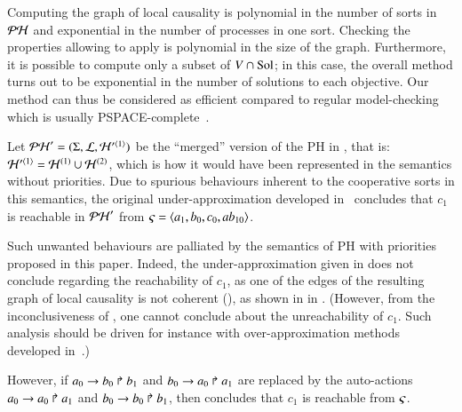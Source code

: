Computing the graph of local causality is polynomial in the number of sorts in $\mathcal{PH}$ and exponential in the number of processes in one sort.
Checking the properties allowing to apply  is polynomial in the size of the graph.
Furthermore, it is possible to compute only a subset of $V \cap \mathrm{Sol}$;
in this case, the overall method turns out to be exponential in the number of solutions to each objective.
Our method can thus be considered as efficient compared to regular model-checking which is usually PSPACE-complete~\cite{Harel02}.



\begin{example}
  Let $\mathcal{PH}' = (\Sigma, \mathcal{L}, \mathcal{H}'^{\langle 1 \rangle})$ be the “merged” version of the PH in , that is: $\mathcal{H}'^{\langle 1 \rangle} = \mathcal{H}^{(1)} \cup \mathcal{H}^{(2)}$,
  which is how it would have been represented in the semantics without priorities.
  Due to spurious behaviours inherent to the cooperative sorts in this semantics, 
  the original under-approximation developed in~\cite{PMR12-MSCS} concludes that $c_1$ is reachable in $\mathcal{PH}'$ from $\varsigma = \mbox{$\langle a_1, b_0, c_0, ab_{10} \rangle$}$.
  
  Such unwanted behaviours are palliated by the semantics of PH with priorities proposed in this paper.
  Indeed, the under-approximation given in  does not conclude regarding the reachability of $c_1$,
  as one of the edges of the resulting graph of local causality is not coherent (),
  as shown in in .
  (However, from the inconclusiveness of , one cannot conclude about the unreachability of $c_1$.
  Such analysis should be driven for instance with over-approximation methods developed in~\cite{PMR12-MSCS}.)
  
  However, if $a_0\rightarrow b_0\Rsh b_1$ and $b_0\rightarrow a_0\Rsh a_1$ are replaced by the auto-actions
  $a_0\rightarrow a_0\Rsh a_1$ and $b_0\rightarrow b_0\Rsh b_1$,
  then  concludes that $c_1$ is reachable from $\varsigma$.

\begin{figure}[tp]
  \centering
\end{figure}
\end{example}
